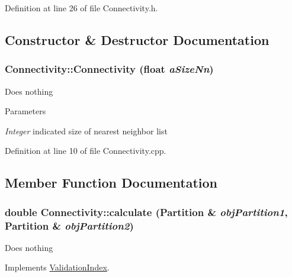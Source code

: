 Definition at line 26 of file Connectivity.h.

\subsection{Constructor \& Destructor Documentation}
\hypertarget{classConnectivity_a0e8314d244056ef148ae0002cdd877a7}{
\subsubsection[{Connectivity}]{\setlength{\rightskip}{0pt plus 5cm}Connectivity::Connectivity (float {\em aSizeNn})}}
\label{classConnectivity_a0e8314d244056ef148ae0002cdd877a7}
Does nothing 
\begin{DoxyParams}{Parameters}
\item[{\em Integer}]indicated size of nearest neighbor list \end{DoxyParams}


Definition at line 10 of file Connectivity.cpp.

\subsection{Member Function Documentation}
\hypertarget{classConnectivity_a5f211e2c2ff7d5f199a985c6f6e68556}{
\subsubsection[{calculate}]{\setlength{\rightskip}{0pt plus 5cm}double Connectivity::calculate ({\bf Partition} \& {\em objPartition1}, \/  {\bf Partition} \& {\em objPartition2})}}
\label{classConnectivity_a5f211e2c2ff7d5f199a985c6f6e68556}
Does nothing 

Implements \hyperlink{classValidationIndex_a8b688d8d53fbdacec393730fe2bab614}{ValidationIndex}.

